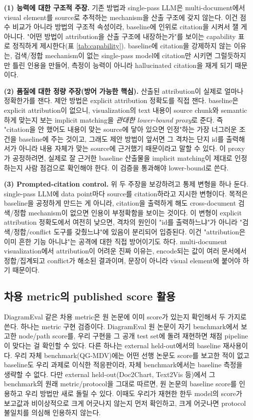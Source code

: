 \documentclass[11pt]{article}
\begin{document}
\textbf{(1) 능력에 대한 구조적 주장.} 기존 방법과 single-pass LLM은 multi-document에서 visual
element를 source로 추적하는 mechanism을 산출 구조에 갖지 않는다. 이건 점수 비교가 아니라 방법의
구조적 속성이라, baseline에 인위로 citation을 시켜서 잴 게 아니다. "어떤 방법이 attribution을
산출 구조에 내장하는가"를 보이는 capability 표로 정직하게 제시한다(표 \ref{tab:capability}).
baseline에 citation을 강제하지 않는 이유는, 검색/정합 mechanism이 없는 single-pass model에
citation만 시키면 그럴듯하지만 틀린 인용을 만들어, 측정이 능력이 아니라 hallucinated citation을
재게 되기 때문이다.

\textbf{(2) 품질에 대한 정량 주장(방어 가능한 핵심).} 산출된 attribution이 실제로 얼마나
정확한가를 잰다. 제안 방법은 explicit attribution 정확도를 직접 잰다. baseline은 explicit
attribution이 없으니, visualization의 text 내용이 source chunk와 semantic하게 맞는지 보는
implicit matching을 \emph{관대한 lower-bound proxy}로 준다. 즉 "citation을 안 했어도 내용이
맞는 source에 닿아 있으면 인정"하는 가장 너그러운 조건을 baseline에 주는 것이고, 그래도 제안
방법이 앞서면 그 격차는 단지 id를 출력해서가 아니라 내용 자체가 맞는 source에 근거했기 때문이라고
말할 수 있다. 이 proxy가 공정하려면, 실제로 잘 근거한 baseline 산출물을 implicit matching이
제대로 인정하는지 사람 점검으로 확인해야 한다. 이 검증을 통과해야 lower-bound로 쓴다.

\textbf{(3) Prompted-citation control.} 위 두 주장을 보강하려고 통제 변형을 하나 둔다.
single-pass LLM에 data point마다 source를 citation하라고 지시한 변형이다. 목적은 baseline을
공정하게 만드는 게 아니라, citation을 출력하게 해도 cross-document 검색/정합 mechanism이 없으면
인용이 부정확함을 보이는 것이다. 이 변형이 explicit attribution 정확도에서 여전히 낮으면,
격차의 원인이 "id를 출력하느냐"가 아니라 "검색/정합/conflict 도구를 갖췄느냐"에 있음이 분리되어
입증된다. 이건 "attribution은 이미 흔한 기능 아니냐"는 공격에 대한 직접 방어이기도 하다.
multi-document visualization에서 attribution이 어려운 진짜 이유는, encode되는 값이 여러 문서에서
정합/집계되고 conflict가 해소된 결과이며, 문장이 아니라 visual element에 붙어야 하기 때문이다.

\subsection{차용 metric의 published score 활용}

DiagramEval 같은 차용 metric은 원 논문에 이미 score가 있는지 확인해서 두 가지로 쓴다. 하나는
metric 구현 검증이다. DiagramEval 원 논문이 자기 benchmark에서 보고한 node/path score를, 우리
구현을 그 공개 test set에 돌려 재현하면 채점 pipeline이 맞다는 걸 확인할 수 있다. 다른 하나는
external held-out에서의 baseline 재사용이다. 우리 자체 benchmark(QG-MDV)에는 어떤 선행 논문도
score를 보고한 적이 없고 baseline도 우리 과제로 이식한 적응판이라, 자체 benchmark에서는 baseline
측정을 생략할 수 없다. 다만 external held-out(Doc2Chart, Text2Vis 등)에서 그 benchmark의 원래
metric/protocol을 그대로 따르면, 원 논문의 baseline score를 인용하고 우리 방법만 새로 돌릴 수
있다. 이때도 우리가 재현한 한두 model의 score가 보고값과 비이상적으로 크게 어긋나지 않는지 먼저
확인하고, 크게 어긋나면 protocol 불일치를 의심해 인용하지 않는다.
\end{document}
